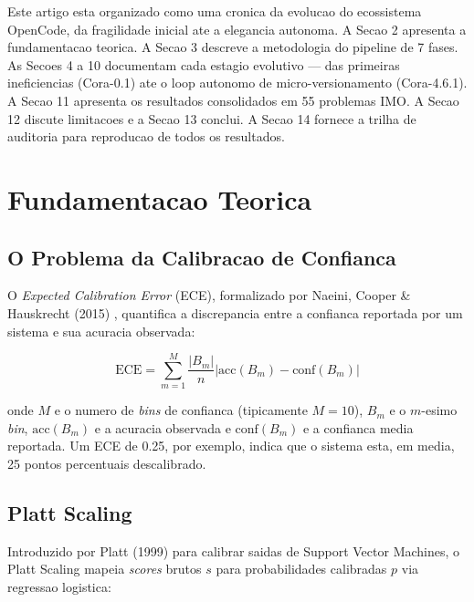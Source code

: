 \documentclass[5p]{elsarticle}
\begin{document}
Este artigo esta organizado como uma cronica da evolucao do ecossistema OpenCode,
da fragilidade inicial ate a elegancia autonoma. A Secao 2 apresenta a fundamentacao
teorica. A Secao 3 descreve a metodologia do pipeline de 7 fases. As Secoes 4 a 10
documentam cada estagio evolutivo --- das primeiras ineficiencias (Cora-0.1) ate o
loop autonomo de micro-versionamento (Cora-4.6.1). A Secao 11 apresenta os
resultados consolidados em 55 problemas IMO. A Secao 12 discute limitacoes e a
Secao 13 conclui. A Secao 14 fornece a trilha de auditoria para reproducao de todos
os resultados.

\section{Fundamentacao Teorica}

\subsection{O Problema da Calibracao de Confianca}

O \textit{Expected Calibration Error} (ECE), formalizado por Naeini, Cooper \&
Hauskrecht (2015) \cite{naeini2015ece}, quantifica a discrepancia entre a confianca
reportada por um sistema e sua acuracia observada:

\begin{equation}
\text{ECE} = \sum_{m=1}^{M} \frac{|B_m|}{n} \left| \text{acc}(B_m) - \text{conf}(B_m) \right|
\label{eq:ece}
\end{equation}

onde $M$ e o numero de \textit{bins} de confianca (tipicamente $M=10$), $B_m$ e o
$m$-esimo \textit{bin}, $\text{acc}(B_m)$ e a acuracia observada e $\text{conf}(B_m)$
e a confianca media reportada. Um ECE de 0.25, por exemplo, indica que o sistema
esta, em media, 25 pontos percentuais descalibrado.

\subsection{Platt Scaling}

Introduzido por Platt (1999) \cite{platt1999} para calibrar saidas de Support Vector
Machines, o Platt Scaling mapeia \textit{scores} brutos $s$ para probabilidades
calibradas $p$ via regressao logistica:
\end{document}
